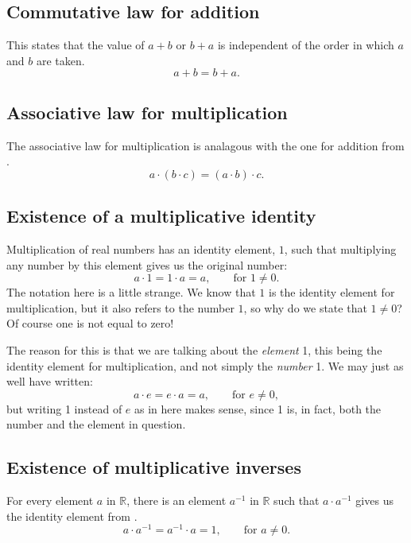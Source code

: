 \subsection{Commutative law for addition}
\label{sec:alg:comm:add}
This states that the value of $a + b$ or $b + a$ is independent of the order
in which $a$ and $b$ are taken.\cite[p.~14]{pinter}
\begin{equation}
    a + b = b + a.
\end{equation}

\subsection{Associative law for multiplication}
The associative law for multiplication is analagous with the one for
addition from .
\begin{equation}
    a \cdot (b \cdot c) = (a \cdot b) \cdot c.
\end{equation}

\subsection{Existence of a multiplicative identity}
\label{sec:mult:id}
Multiplication of real numbers has an identity element, $1$,
such that multiplying any number by this element gives us the original number:
\begin{equation}
    a \cdot 1 = 1 \cdot a = a, \qquad \text{for } 1 \neq 0.
    \label{eq:mult:id}
\end{equation}
The notation here is a little strange.
We know that $1$ is the identity element for multiplication, but it also
refers to the number $1$, so why do we state that $1 \neq 0$?
Of course one is not equal to zero!

The reason for this is that we are talking about the \emph{element} 1, this
being the identity element for multiplication, and not simply the \emph{number}
1. We may just as well have written:
\begin{equation*}
    a \cdot e = e \cdot a = a, \qquad \text{for } e \neq 0,
\end{equation*}
but writing 1 instead of $e$ as in  here makes sense,
since 1 is, in fact, both the number and the element in question.

\subsection{Existence of multiplicative inverses}
For every element $a$ in $\mathbb{R}$, there is an element $a^{-1}$ in 
$\mathbb{R}$ such that $a \cdot a^{-1}$ gives us the identity element
from .
\begin{equation}
    a \cdot a^{-1} = a^{-1} \cdot a = 1, \qquad \text{for } a \neq 0.
\end{equation}

